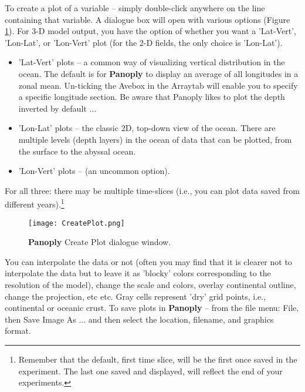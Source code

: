 \documentclass[11pt,fleqn]{book} %
\begin{document}
To create a plot of a variable -- simply double-click anywhere on the line containing that variable. A dialogue box will open with various options (Figure \ref{fig:CreatePlot}). For 3-D model output, you have the option of whether you want a \footnotesize\textsf{'Lat-Vert'}\normalsize, \footnotesize\textsf{'Lon-Lat'}\normalsize, or \footnotesize\textsf{'Lon-Vert' }\normalsize plot (for the 2-D fields, the only choice is \footnotesize\textsf{'Lon-Lat'}\normalsize).
\begin{itemize}
\vspace{1mm}
\item \footnotesize\textsf{'Lat-Vert' }\normalsize plots -- a common way of visualizing vertical distribution in the ocean. The default is for \textbf{Panoply} to display an average of all longitudes in a zonal mean. Un-ticking the \footnotesize\textsf{Ave}\normalsize box in the \footnotesize\textsf{Array}\normalsize tab will enable you to specify a specific longitude section. Be aware that Panoply likes to plot the depth inverted by default ...
\vspace{1mm}
\item \footnotesize\textsf{'Lon-Lat' }\normalsize plots -- the classic 2D, top-down view of the ocean. There are multiple levels (depth layers) in the ocean of data that can be plotted, from the surface to the abyssal ocean.
\vspace{1mm}
\item \footnotesize\textsf{'Lon-Vert' }\normalsize plots -- (an uncommon option).
\end{itemize}
\vspace{2mm}
For all three: there may be multiple time-slices (i.e., you can plot data saved from different years).\footnote{Remember that the default, first time slice, will be the first once saved in the experiment. The last one saved and displayed, will reflect the end of your experiments.} 

\begin{figure}[ht]
\begin{center}
\texttt{[image: CreatePlot.png]}
\end{center}
\caption{\textbf{Panoply} \textsf{Create Plot} dialogue window.}
\label{fig:CreatePlot}
\end{figure}

You can interpolate the data or not (often you may find that it is clearer not to interpolate the data but to leave it as 'blocky' colors corresponding to the resolution of the model), change the scale and colors, overlay continental outline, change the projection, etc etc. Gray cells represent 'dry' grid points, i.e., continental or oceanic crust.
To save plots in \textbf{Panoply} -- from the file menu: \footnotesize\textsf{File}\normalsize, then \footnotesize\textsf{Save Image As ... }\normalsize and then select the location, filename, and graphics format.
\end{document}
